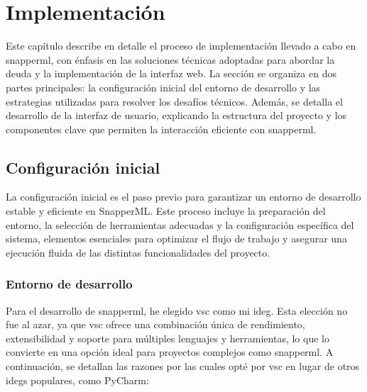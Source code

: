 \chapter{Implementación}
Este capítulo describe en detalle el proceso de implementación llevado a cabo en \Gls{snapperml}, con énfasis en las soluciones técnicas adoptadas para abordar la \gls{deuda} y la implementación de la interfaz web. La sección se organiza en dos partes principales: la configuración inicial del entorno de desarrollo y las estrategias utilizadas para resolver los desafíos técnicos. Además, se detalla el desarrollo de la interfaz de usuario, explicando la estructura del proyecto y los componentes clave que permiten la interacción eficiente con \Gls{snapperml}.

\section{Configuración inicial}
La configuración inicial es el paso previo para garantizar un entorno de desarrollo estable y eficiente en SnapperML. Este proceso incluye la preparación del entorno, la selección de herramientas adecuadas y la configuración específica del sistema, elementos esenciales para optimizar el flujo de trabajo y asegurar una ejecución fluida de las distintas funcionalidades del proyecto.

\subsection{Entorno de desarrollo}

Para el desarrollo de \Gls{snapperml}, he elegido \acrfull{vsc} como mi \Gls{ideg}. Esta elección no fue al azar, ya que \acrlong{vsc} ofrece una combinación única de rendimiento, extensibilidad y soporte para múltiples lenguajes y herramientas, lo que lo convierte en una opción ideal para proyectos complejos como \Gls{snapperml}. A continuación, se detallan las razones por las cuales opté por \acrshort{vsc} en lugar de otros \Glspl{ideg} populares, como PyCharm:

